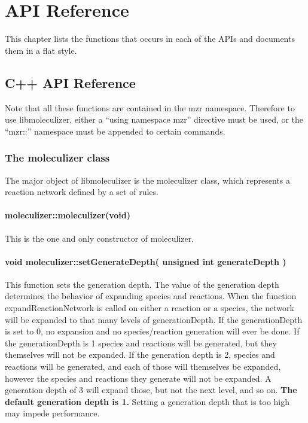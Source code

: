 \chapter {API Reference}
\label{chap:apiReference}

This chapter lists the functions that occurs in each of the APIs and
documents them in a flat style.

\section{C++ API Reference}

Note that all these functions are contained in the mzr namespace.
Therefore to use libmoleculizer, either a ``using namespace mzr''
directive must be used, or the ``mzr::'' namespace must be appended to
certain commands.  

\subsection{The moleculizer class}
The major object of libmoleculizer is the moleculizer class, which
represents a reaction network defined by a set of rules.  

\subsubsection{moleculizer::moleculizer(void)}
This is the one and only constructor of moleculizer.  

\subsubsection{void moleculizer::setGenerateDepth( unsigned int
  generateDepth )}
This function sets the generation depth.  The value of the generation
depth determines the behavior of expanding species and reactions.
When the function expandReactionNetwork is called on either a reaction
or a species, the network will be expanded to that many levels of
generationDepth.  If the generationDepth is set to 0, no expansion and
no species/reaction generation will ever be done.  If the
generationDepth is 1 species and reactions will be generated, but they
themselves will not be expanded.  If the generation depth is 2,
species and reactions will be generated, and each of those will
themselves be expanded, however the species and reactions they
generate will not be expanded.  A generation depth of 3 will expand
those, but not the next level, and so on. \textbf{The default
  generation depth is 1.}  Setting a generation depth that is too high
may impede performance.  

